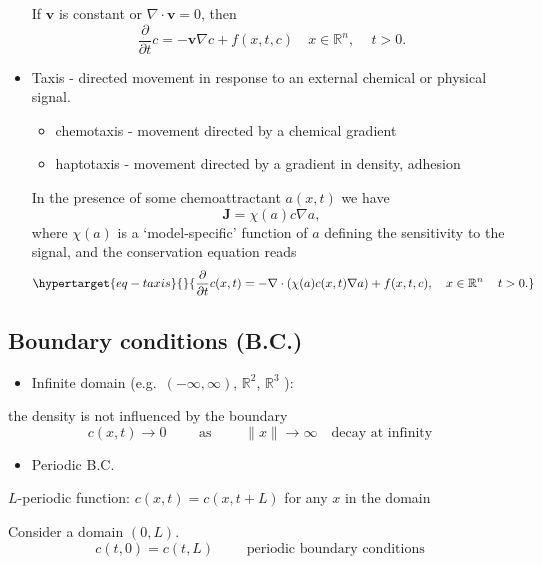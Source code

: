 \documentclass[
  letterpaper,
  DIV=11,
  numbers=noendperiod]{scrreprt}
\providecommand{\tightlist}{%
  \setlength{\itemsep}{0pt}\setlength{\parskip}{0pt}}\usepackage{longtable,booktabs,array}
\theoremstyle{definition}
\theoremstyle{plain}
\theoremstyle{plain}
\theoremstyle{remark}
\begin{document}
\begin{itemize}
  If \(\textbf{v}\) is constant or \(\nabla \cdot \textbf{v} = 0\), then
  \[
  \frac{\partial}{\partial t} c = - \textbf{v} \nabla c  + f(x,t ,c)
  \quad x\in \mathbb R^n, \,  \quad t >0.
  \]
\item
  Taxis - directed movement in response to an external chemical or
  physical signal.

  \begin{itemize}
  \tightlist
  \item
    chemotaxis - movement directed by a chemical gradient
  \item
    haptotaxis - movement directed by a gradient in density, adhesion
  \end{itemize}

  In the presence of some chemoattractant \(a(x,t)\) we have \[
    {\mathbf{J}} = \chi(a) c \nabla a,  
    \] where \(\chi(a)\) is a `model-specific' function of \(a\)
  defining the sensitivity to the signal, and the conservation equation
  reads \begin{equation}\protect\hypertarget{eq-taxis}{}{
    \frac{\partial}{\partial t} c(x,t) = -\nabla \cdot (\chi(a) c(x,t) \nabla a )  + f(x,t ,c),
    \quad x\in \mathbb R^n \,  \quad t >0. 
    }\label{eq-taxis}\end{equation}
\end{itemize}

\hypertarget{boundary-conditions-b.c.}{%
\subsection{Boundary conditions (B.C.)}\label{boundary-conditions-b.c.}}

\begin{itemize}
\tightlist
\item
  Infinite domain (e.g.~\((-\infty, \infty)\), \(\mathbb R^2\),
  \(\mathbb R^3\) ):
\end{itemize}

the density is not influenced by the boundary \[
c(x,t) \to 0 \qquad \text{ as } \qquad \|x\| \to \infty \quad  \text{decay at infinity}
\]

\begin{itemize}
\tightlist
\item
  Periodic B.C.
\end{itemize}

\(L\)-periodic function: \(c(x,t) = c(x,t +L)\) for any \(x\) in the
domain

Consider a domain \((0,L)\). \[
c(t,0) = c(t,L) \qquad  \text{ periodic boundary conditions}
\]
\end{document}
